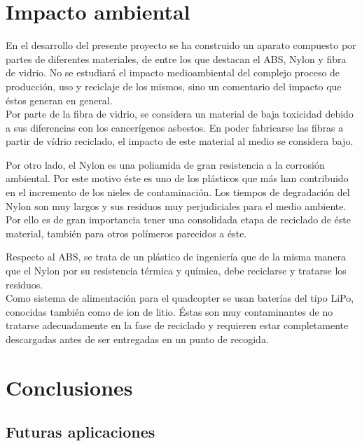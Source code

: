 \documentclass[twoside,11pt]{book}
\begin{document}
\chapter{Impacto ambiental} \label{impacto}

En el desarrollo del presente proyecto se ha construido un aparato  compuesto por partes de diferentes materiales, de entre los que destacan el ABS, Nylon y fibra de vidrio. No se estudiará el  impacto medioambiental del complejo proceso de producción, uso y reciclaje de los mismos, sino un comentario del impacto que éstos generan en general. \\

Por parte de la fibra de vidrio, se considera un material de baja toxicidad debido a sus diferencias con los cancerígenos asbestos. En poder fabricarse las fibras a partir de vídrio reciclado, el impacto de este material al medio se considera bajo.

Por otro lado, el Nylon es una poliamida de gran resistencia a la corrosión ambiental. Por este motivo éste es uno de los plásticos que más han contribuido en el incremento de los nieles de contaminación. Los tiempos de degradación del Nylon son muy largos y sus residuos muy perjudiciales para el medio ambiente. Por ello es de gran importancia tener una consolidada etapa de reciclado de éste material, también para otros polímeros parecidos a éste.

Respecto al ABS, se trata de un plástico de ingeniería que de la misma manera que el Nylon por su resistencia térmica y química, debe reciclarse y tratarse los residuos. \\

Como sistema de alimentación para el quadcopter se usan baterías del tipo LiPo, conocidas también como de ion de litio. Éstas son muy contaminantes de no tratarse adecuadamente en la fase de reciclado y requieren estar completamente descargadas antes de ser entregadas en un punto de recogida.

\newpage

\chapter{Conclusiones} \label{conclusiones}

\section*{Futuras aplicaciones}

\newpage
\end{document}
